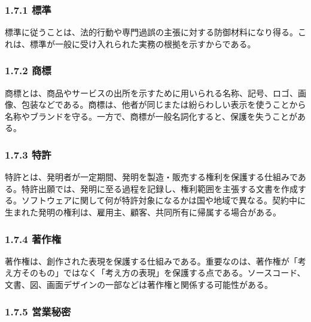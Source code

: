 \documentclass[uplatex,dvipdfmx,a4paper,11pt]{jsarticle}
\begin{document}
\subsubsection*{1.7.1 標準}


標準に従うことは、法的行動や専門過誤の主張に対する防御材料になり得る。これは、標準が一般に受け入れられた実務の根拠を示すからである。

\subsubsection*{1.7.2 商標}


商標とは、商品やサービスの出所を示すために用いられる名称、記号、ロゴ、画像、包装などである。商標は、他者が同じまたは紛らわしい表示を使うことから名称やブランドを守る。一方で、商標が一般名詞化すると、保護を失うことがある。

\subsubsection*{1.7.3 特許}


特許とは、発明者が一定期間、発明を製造・販売する権利を保護する仕組みである。特許出願では、発明に至る過程を記録し、権利範囲を主張する文書を作成する。ソフトウェアに関して何が特許対象になるかは国や地域で異なる。契約中に生まれた発明の権利は、雇用主、顧客、共同所有に帰属する場合がある。

\subsubsection*{1.7.4 著作権}


著作権は、創作された表現を保護する仕組みである。重要なのは、著作権が「考え方そのもの」ではなく「考え方の表現」を保護する点である。ソースコード、文書、図、画面デザインの一部などは著作権と関係する可能性がある。

\subsubsection*{1.7.5 営業秘密}

\end{document}
